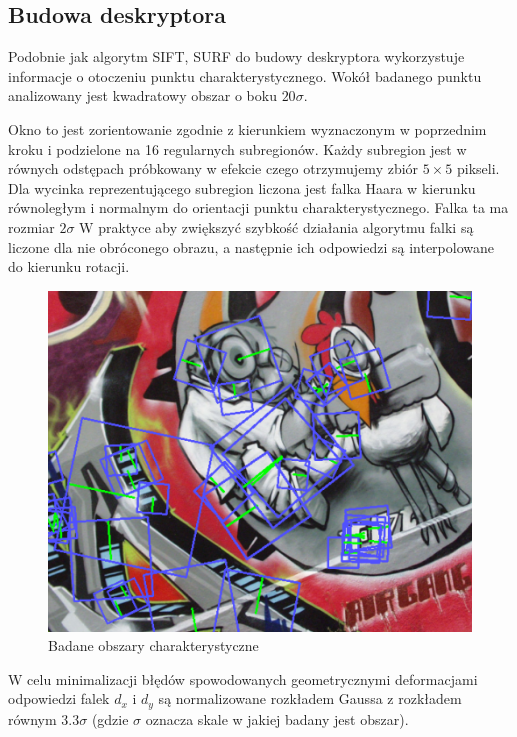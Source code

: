 \subsection{Budowa deskryptora}
Podobnie jak algorytm SIFT, SURF do budowy deskryptora wykorzystuje informacje o otoczeniu punktu charakterystycznego. Wokół badanego punktu analizowany jest kwadratowy obszar o boku $20\sigma$. 

Okno to jest zorientowanie zgodnie z kierunkiem wyznaczonym w poprzednim kroku i podzielone na 16 regularnych subregionów. Każdy subregion jest w równych odstępach próbkowany w efekcie czego otrzymujemy zbiór $5\times5$ pikseli. Dla wycinka reprezentującego subregion liczona jest falka Haara w kierunku równoległym i normalnym do orientacji punktu charakterystycznego.  Falka ta ma rozmiar $2\sigma$ W praktyce aby zwiększyć szybkość działania algorytmu falki są liczone dla nie obróconego obrazu, a następnie ich odpowiedzi są interpolowane do kierunku rotacji. 
\begin{figure}[!htb]
\centering
\includegraphics[scale=0.8]{pict/02/surf/surf_bay_example.png}
\caption{Badane obszary charakterystyczne}
\label{fig:surf_bay_example}
\end{figure}
W celu minimalizacji błędów spowodowanych geometrycznymi deformacjami odpowiedzi falek $d_x$ i $d_y$ są normalizowane rozkładem Gaussa z rozkładem równym $3.3\sigma$ (gdzie $\sigma$ oznacza skale w jakiej badany jest obszar).

